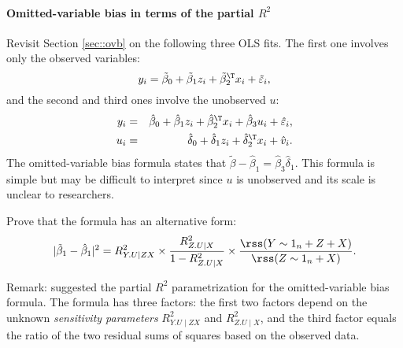\paragraph{Omitted-variable bias in terms of the partial $R^2$}\label{hw09::cochran-partial-R2}

Revisit Section \ref{sec::ovb} on the following three OLS fits. The first one involves only the observed variables:
$$
y_i  =  \tilde{\beta}_0 + \tilde{\beta}_1 z_i + \tilde{\beta}^{\T}_2 x_i + \tilde{\varepsilon}_i,
$$
and the second and third ones involve the unobserved $u$:
\begin{eqnarray*}
y_i &=& \hat{\beta}_0 + \hat{\beta}_1 z_i + \hat{\beta}^{\T}_2 x_i  + \hat{\beta}_3 u_i + \hat{\varepsilon}_i ,\\
u_i &=&  \hat{\delta}_0 +  \hat{\delta}_1 z_i  + \hat{\delta}_2^{\T} x_i + \hat{v}_i.
\end{eqnarray*}
The omitted-variable bias formula states that $\tilde{\beta} - \hat{\beta}_1 =  \hat{\beta}_3 \hat{\delta}_1$. This formula is simple but may be difficult to interpret since $u$ is unobserved and its scale is unclear to researchers. 

Prove that the formula has an alternative form:
$$
|\tilde{\beta}_1 - \hat{\beta}_1|^2 = R^2_{Y.U\mid ZX} \times \frac{R^2_{Z.U\mid X}}{1 - R^2_{Z.U\mid X}}  
\times   \frac{ \rss(Y\sim 1_n+Z+X)  }{  \rss(Z\sim 1_n+X) }  . 
$$
 

Remark: \citet{cinelli2020making} suggested the partial $R^2$ parametrization for the omitted-variable bias formula. 
The formula has three factors: the first two factors depend on the unknown {\it sensitivity parameters} $R^2_{Y.U\mid ZX} $ and $R^2_{Z.U\mid X}$, and the third factor equals the ratio of the two residual sums of squares based on the observed data. 





